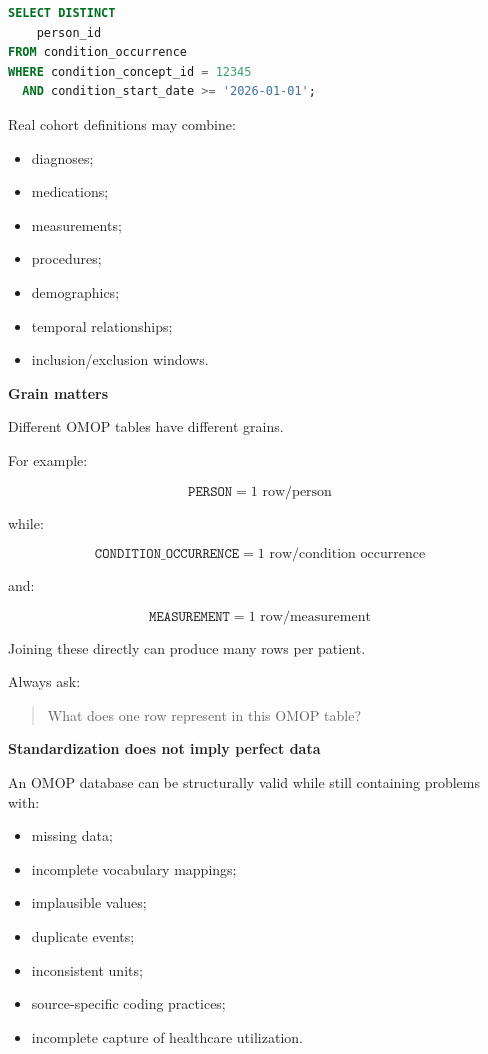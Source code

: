 \documentclass[11pt,letterpaper]{article}
\begin{document}
\begin{lstlisting}[language=SQL]
SELECT DISTINCT
    person_id
FROM condition_occurrence
WHERE condition_concept_id = 12345
  AND condition_start_date >= '2026-01-01';
\end{lstlisting}

Real cohort definitions may combine:

\begin{itemize}[leftmargin=*]
    \item diagnoses;
    \item medications;
    \item measurements;
    \item procedures;
    \item demographics;
    \item temporal relationships;
    \item inclusion/exclusion windows.
\end{itemize}

\textbf{Grain matters}

Different OMOP tables have different grains.

For example:

\[
\texttt{PERSON}
=
1\text{ row/person}
\]

while:

\[
\texttt{CONDITION\_OCCURRENCE}
=
1\text{ row/condition occurrence}
\]

and:

\[
\texttt{MEASUREMENT}
=
1\text{ row/measurement}
\]

Joining these directly can produce many rows per patient.

Always ask:

\begin{quote}
What does one row represent in this OMOP table?
\end{quote}

\textbf{Standardization does not imply perfect data}

An OMOP database can be structurally valid while still containing problems
with:

\begin{itemize}[leftmargin=*]
    \item missing data;
    \item incomplete vocabulary mappings;
    \item implausible values;
    \item duplicate events;
    \item inconsistent units;
    \item source-specific coding practices;
    \item incomplete capture of healthcare utilization.
\end{itemize}
\end{document}
